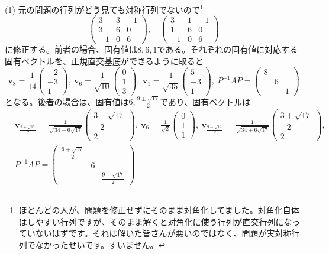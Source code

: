 \noindent (1) 元の問題の行列がどう見ても対称行列でないので\footnote{ほとんどの人が、問題を修正せずにそのまま対角化してました。対角化自体はしやすい行列ですが、そのまま解くと対角化に使う行列が直交行列になっていないはずです。それは解いた皆さんが悪いのではなく、問題が実対称行列でなかったせいです。すいません。}
\[
\begin{pmatrix}
3 & 3 & -1 \\
3 & 6 & 0 \\
-1 & 0 & 6
\end{pmatrix}, \quad
\begin{pmatrix}
3 & 1 & -1 \\
1 & 6 & 0 \\
-1 & 0 & 6
\end{pmatrix}\]
に修正する。前者の場合、固有値は$8, 6, 1$である。それぞれの固有値に対応する固有ベクトルを、正規直交基底ができるように取ると
\[
\bm{v}_{8} = 
\frac{1}{14}
\begin{pmatrix}
-2 \\
-3 \\
1
\end{pmatrix}, \ 
\bm{v}_{6} =
\frac{1}{\sqrt{10}}
\begin{pmatrix}
0 \\
1 \\
3
\end{pmatrix}, \ 
\bm{v}_{1} =
\frac{1}{\sqrt{35}}
\begin{pmatrix}
5 \\
-3 \\
1
\end{pmatrix}, \ 
P^{-1} A P 
= 
\begin{pmatrix}
8 \\
& 6 \\
& & 1
\end{pmatrix}
\]
となる。後者の場合は、固有値は$6, \frac{9 \pm \sqrt{17}}{2}$であり、固有ベクトルは
\begin{align*}
& \bm{v}_{\frac{9 + \sqrt{17}}{2}} = 
\frac{1}{\sqrt{34 - 6\sqrt{17}}}
\begin{pmatrix}
3 - \sqrt{17} \\
-2 \\
2
\end{pmatrix}, \ 
\bm{v}_{6} =
\frac{1}{\sqrt{2}}
\begin{pmatrix}
0 \\
1 \\
1
\end{pmatrix}, \ 
\bm{v}_{\frac{9 - \sqrt{17}}{2}} =
\frac{1}{\sqrt{34 + 6\sqrt{17}}}
\begin{pmatrix}
3 + \sqrt{17} \\
-2 \\
2
\end{pmatrix}, \\
& P^{-1} A P 
= 
\begin{pmatrix}
\frac{9 + \sqrt{17}}{2} \\
& 6 \\
& & \frac{9 - \sqrt{17}}{2}
\end{pmatrix}
\end{align*}

